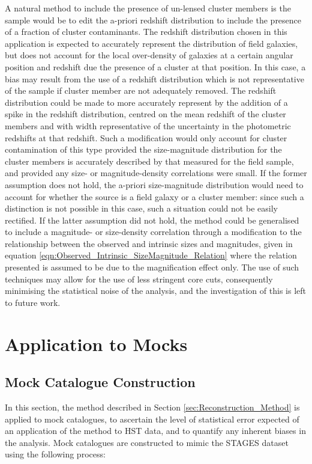 \documentclass[useAMS,usenatbib,times,letter,amssymb]{mn2e}
\begin{document}
A natural method to include the presence of un-lensed cluster members is the sample would be to edit the a-priori redshift distribution to include the presence of a fraction of cluster contaminants. The redshift distribution chosen in this application is expected to accurately represent the distribution of field galaxies, but does not account for the local over-density of galaxies at a certain angular position and redshift due the presence of a cluster at that position. In this case, a bias may result from the use of a redshift distribution which is not representative of the sample if cluster member are not adequately removed. The redshift distribution could be made to more accurately represent by the addition of a spike in the redshift distribution, centred on the mean redshift of the cluster members and with width representative of the uncertainty in the photometric redshifts at that redshift. Such a modification would only account for cluster contamination of this type provided the size-magnitude distribution for the cluster members is accurately described by that measured for the field sample, and provided any size- or magnitude-density correlations were small. If the former assumption does not hold, the a-priori size-magnitude distribution would need to account for whether the source is a field galaxy or a cluster member: since such a distinction is not possible in this case, such a situation could not be easily rectified. If the latter assumption did not hold, the method could be generalised to include a magnitude- or size-density correlation through a modification to the relationship between the observed and intrinsic sizes and magnitudes, given in equation \ref{eqn:Observed_Intrinsic_SizeMagnitude_Relation} where the relation presented is assumed to be due to the magnification effect only. The use of such techniques may allow for the use of less stringent core cuts, consequently minimising the statistical noise of the analysis, and the investigation of this is left to future work.


\section{Application to Mocks}\label{sec:ApplicationToMocks}

\subsection{Mock Catalogue Construction}\label{sec:Mock_Catalogue_Construction}
In this section, the method described in Section \ref{sec:Reconstruction_Method} is applied to mock catalogues, to ascertain the level of statistical error expected of an application of the method to HST data, and to quantify any inherent biases in the analysis. Mock catalogues are constructed to mimic the STAGES dataset using the following process:
\end{document}
